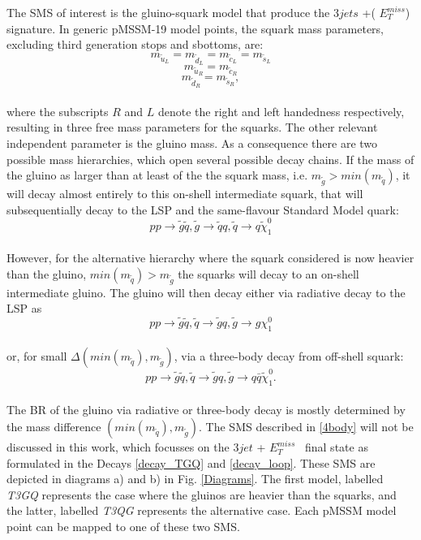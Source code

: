 \documentclass[a4paper,11pt]{article}
\newcommand{\MET}{{ $E_T ^{miss}$}}
\begin{document}
The SMS of interest is the gluino-squark model that produce the $3jets$ +(\MET) signature. In generic pMSSM-19 model points, the squark mass parameters, excluding  third generation stops and sbottoms, are: 
\begin{equation*}
m_{\tilde u_L} = m_{\tilde d_L} = m_{\tilde c_L} = m_{\tilde s_L} 
\end{equation*}
\begin{equation*}
m_{\tilde u_R} = m_{\tilde c_R} 
\end{equation*}
\begin{equation*}
m_{\tilde d_R} = m_{\tilde s_R} ,
\end{equation*}
\\
where the subscripts $R$ and $L$ denote the right and left handedness respectively, resulting in three free mass parameters for the squarks. The other relevant independent parameter is the gluino mass. As a consequence there are two possible mass hierarchies, which open several possible decay chains. If the mass of the gluino as larger than at least of the the squark mass, i.e. $m_{\tilde g} > min(m_{\tilde q})$, it will decay almost entirely to this on-shell intermediate squark, that will subsequentially decay to the LSP and the same-flavour Standard Model quark:
\begin{equation}\label{decay_TGQ}
p p \rightarrow \tilde g \tilde q , \tilde g \rightarrow \tilde q q , \tilde q \rightarrow q \tilde \chi_1 ^0
\end{equation}
\\
However, for the alternative hierarchy where the squark considered is now heavier than the gluino, $ min(m_{\tilde q}) > m_{\tilde g}$ the squarks will decay to an on-shell intermediate gluino. The gluino will then decay either via radiative decay to the LSP as 
\begin{equation}\label{decay_loop}
p p \rightarrow \tilde g \tilde q ,\tilde q \rightarrow \tilde g q , \tilde g \rightarrow g \chi_1 ^0
\end{equation} 
\\
or, for small $\Delta (min(m_{\tilde q}), m_{\tilde g})$,  via a three-body decay from off-shell squark:
\begin{equation}\label{4body}
p p \rightarrow \tilde g \tilde q ,\tilde q \rightarrow \tilde g q, \tilde g \rightarrow q \bar q \tilde \chi _1 ^0.
\end{equation}
\\
The BR of the gluino via radiative or three-body decay is mostly determined by the mass difference $(min(m_{\tilde q}), m_{\tilde g})$. The SMS described in \ref{4body} will not be discussed in this work, which focusses on the $3jet$ + \MET~ final state as formulated in the Decays \ref{decay_TGQ} and \ref{decay_loop}. These SMS are depicted in diagrams a) and b) in Fig. \ref{Diagrams}. The first model, labelled \textit{T3GQ} represents the case where the gluinos are heavier than the squarks, and the latter, labelled \textit{T3QG} represents the alternative case. Each pMSSM model point can be mapped to one of these two SMS.
\end{document}
